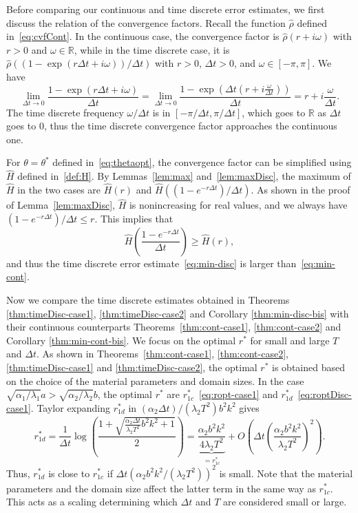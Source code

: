 \documentclass[reqno]{amsart}
\begin{document}
Before comparing our continuous and time discrete error estimates, we first discuss the relation of the convergence factors.  
Recall the function $\hat\rho$ defined in~\eqref{eq:cvfCont}. In the continuous case, the convergence factor is $\hat\rho(r+i\omega)$ with $r>0$ and $\omega\in\mathbb{R}$, while in the time discrete case, it is $\hat \rho((1 - \exp(r\Delta t+i\omega)) / \Delta t)$ with $r>0$, $\Delta t>0$, and $\omega\in[-\pi, \pi]$. We have
\[\lim_{\Delta t\rightarrow 0}\frac{1 - \exp(r\Delta t+i\omega)}{\Delta t} = \lim_{\Delta t\rightarrow 0}\frac{1 - \exp(\Delta t(r+i\frac{\omega}{\Delta t}))}{\Delta t} = r+i\frac{\omega}{\Delta t}.\] 
The time discrete frequency $\omega/\Delta t$ is in $[-\pi/\Delta t, \pi/\Delta t]$, which goes to $\mathbb{R}$ as $\Delta t$ goes to 0, thus the time discrete convergence factor approaches the continuous one.

For $\theta = \theta^*$ defined in~\eqref{eq:thetaopt}, the convergence factor can be simplified using $\hat{H}$ defined in~\eqref{def:H}.
By Lemmas~\ref{lem:max} and~\ref{lem:maxDisc}, the maximum of $\hat H$ in the two cases are $\hat H(r)$ and $\hat H((1-e^{-r\Delta t})/\Delta t)$.
As shown in the proof of Lemma~\ref{lem:maxDisc}, $\hat{H}$ is nonincreasing for real values, and we always have $(1-e^{-r \Delta t})/\Delta t \leq r$. 
This implies that
\[\hat H\left(\frac{1-e^{-r\Delta t}}{\Delta t}\right) \geq \hat H(r),\] 
and thus the time discrete error estimate~\eqref{eq:min-disc} is larger than~\eqref{eq:min-cont}. 

Now we compare the time discrete estimates obtained in Theorems \ref{thm:timeDisc-case1}, \ref{thm:timeDisc-case2} and Corollary \ref{thm:min-disc-bis} with their continuous counterparts Theorems~\ref{thm:cont-case1}, \ref{thm:cont-case2} and Corollary \ref{thm:min-cont-bis}. We focus on the optimal $r^*$ for small and large $T$ and $\Delta t$. As shown in Theorems~\ref{thm:cont-case1}, \ref{thm:cont-case2}, \ref{thm:timeDisc-case1} and \ref{thm:timeDisc-case2}, the optimal $r^*$ is obtained based on the choice of the material parameters and domain sizes. In the case $\sqrt{\alpha_1/\lambda_1} a  >  \sqrt{\alpha_2/\lambda_2} b$, the optimal $r^*$ are $r^*_{1c}$~\eqref{eq:ropt-case1} and $r^*_{1d}$~\eqref{eq:roptDisc-case1}. Taylor expanding $r^*_{1d}$ in $(\alpha_2\Delta t)/(\lambda_2T^2) b^2 k^2$ gives 
\begin{equation}\label{eq:taylor}
r^*_{1d} = \frac1{\Delta t}\log\left(\frac{1 + \sqrt{\frac{\alpha_2\Delta t}{\lambda_2T^2} b^2 k^2   + 1}}{2}\right) = \underbrace{\frac{\alpha_2 b^2 k^2}{4 \lambda_2 T^2}}_{=r^*_{1c}} + O\left(\Delta t \left(\frac{\alpha_2 b^2 k^2}{\lambda_2 T^2}\right)^2\right).
\end{equation}
Thus, $r^*_{1d}$ is close to $r^*_{1c}$ if $\Delta t \left(\alpha_2 b^2 k^2/(\lambda_2 T^2)\right)^2$ is small. Note that the material parameters and the domain size affect the latter term in the same way as $r^*_{1c}$. This acts as a scaling determining which $\Delta t$ and $T$ are considered small or large.
\end{document}
